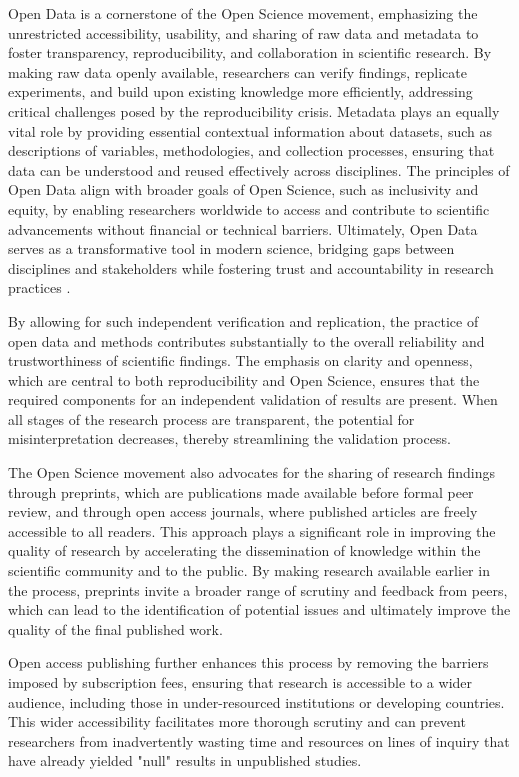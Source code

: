 \documentclass{article}
\begin{document}

Open Data is a cornerstone of the Open Science movement, emphasizing the unrestricted accessibility, usability, and sharing of raw data and metadata to foster transparency, reproducibility, and collaboration in scientific research. By making raw data openly available, researchers can verify findings, replicate experiments, and build upon existing knowledge more efficiently, addressing critical challenges posed by the reproducibility crisis. Metadata plays an equally vital role by providing essential contextual information about datasets, such as descriptions of variables, methodologies, and collection processes, ensuring that data can be understood and reused effectively across disciplines. The principles of Open Data align with broader goals of Open Science, such as inclusivity and equity, by enabling researchers worldwide to access and contribute to scientific advancements without financial or technical barriers. Ultimately, Open Data serves as a transformative tool in modern science, bridging gaps between disciplines and stakeholders while fostering trust and accountability in research practices \cite{burgelman_open_2019}.

By allowing for such independent verification and replication, the practice of open data and methods contributes substantially to the overall reliability and trustworthiness of scientific findings. The emphasis on clarity and openness, which are central to both reproducibility and Open Science, ensures that the required components for an independent validation of results are present. When all stages of the research process are transparent, the potential for misinterpretation decreases, thereby streamlining the validation process.

The Open Science movement also advocates for the sharing of research findings through preprints, which are publications made available before formal peer review, and through open access journals, where published articles are freely accessible to all readers. This approach plays a significant role in improving the quality of research by accelerating the dissemination of knowledge within the scientific community and to the public. By making research available earlier in the process, preprints invite a broader range of scrutiny and feedback from peers, which can lead to the identification of potential issues and ultimately improve the quality of the final published work.

Open access publishing further enhances this process by removing the barriers imposed by subscription fees, ensuring that research is accessible to a wider audience, including those in under-resourced institutions or developing countries. This wider accessibility facilitates more thorough scrutiny and can prevent researchers from inadvertently wasting time and resources on lines of inquiry that have already yielded "null" results in unpublished studies.
\end{document}
